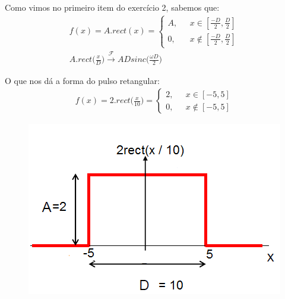 \documentclass[12pt]{article}
\begin{document}
\begin{itemize}
\begin{itemize}
Como vimos no primeiro item do exercício 2, sabemos que:
\begin{align*}
f(x) = A . rect(x) = \left\{ \begin{array}{rl}
 A, &\mbox{ $x \in  [\frac{-D}{2}, \frac{D}{2}]$} \\
 0, &\mbox{ $x \notin [\frac{-D}{2}, \frac{D}{2}]$}
       \end{array} \right.
\\ A . rect\bigg(\frac{x}{D}\bigg) \xrightarrow{\mathscr{F}} ADsinc \bigg(\frac{\omega D}{2}\bigg)
\end{align*}

O que nos dá a forma do pulso retangular:
\begin{align*}
f(x) = 2 . rect\bigg(\frac{x}{10}\bigg) = \left\{ \begin{array}{rl} 
 2, &\mbox{ $x \in  [-5, 5]$} \\
 0, &\mbox{ $x \notin [-5, 5]$}
       \end{array} \right.
\end{align*}

\begin{figure}[htb]
\centering   
\begin{minipage}[b]{0.45\textwidth}
	\centering
        \includegraphics[scale=0.45]{Q3Images/pulse_function_2.png} 
\end{minipage}
\end{figure}


\end{itemize}
\end{itemize}
\end{document}
